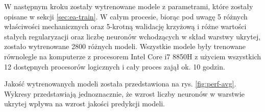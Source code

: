 W następnym kroku zostały wytrenowane modele z parametrami, które zostały opisane w sekcji \ref{sec:ea-train}. W całym procesie, biorąc pod uwagę 5 różnych właściwości mechanicznych oraz 5-krotną walidację krzyżową i różne wartości stałych regularyzacji oraz liczbę neuronów wchodzących w skład warstwy ukrytej, zostało wytrenowane 2800 różnych modeli. Wszystkie modele były trenowane równolegle na komputerze z procesorem Intel Core i7 8850H z użyciem wszystkich 12 dostępnych procesorów logicznych i cały proces zajął ok. 10 godzin.

Jakość wytrenowanych modeli została przedstawiona na rys. \ref{fig:perf-avg}. Wykresy przedstawiają jednoznacznie, że wzrost liczby neuronów w warstwie ukrytej wpływa na wzrost jakości predykcji modeli.


\begin{figure}
     \centering
     \begin{subfigure}[b]{0.37\textwidth}
         \centering

\end{subfigure}
\end{figure}
